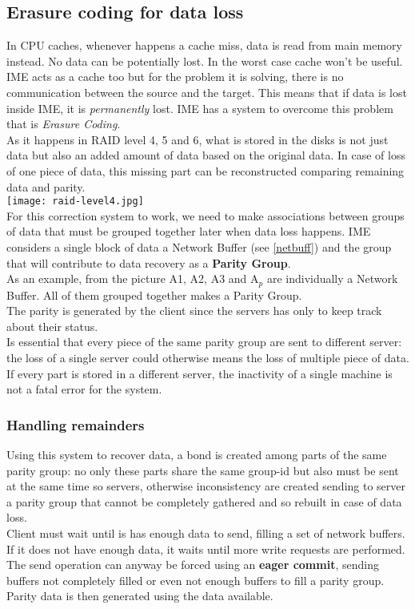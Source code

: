 \subsection{Erasure coding for data loss} \label{pargroup}
In CPU caches, whenever happens a cache miss, data is read from main memory
instead. No data can be potentially lost. In the worst case cache won't be
useful. \\
IME acts as a cache too but for the problem it is solving, there is no
communication between the source and the target. This means that if data
is lost inside IME, it is \textit{permanently} lost. IME has a system to
overcome this problem that is \textit{Erasure Coding}. \\
As it happens in RAID level 4, 5 and 6, what is stored in the disks is not just
data but also an added amount of data based on the original data. In case of
loss of one piece of data, this missing part can be reconstructed comparing
remaining data and parity. \\
\texttt{[image: raid-level4.jpg]} \\
For this correction system to work, we need to make associations between groups
of data that must be grouped together later when data loss happens. IME
considers a single block of data a Network Buffer (see \ref{netbuff}) and the
group that will contribute to data recovery as a \textbf{Parity Group}. \\
As an example, from the picture A1, A2, A3 and A$_p$ are individually a Network
Buffer. All of them grouped together makes a Parity Group. \\
The parity is generated by the client since the servers has only to keep track
about their status. \\
Is essential that every piece of the same parity group are sent to
different server: the loss of a single server could otherwise means the loss of
multiple piece of data. If every part is stored in a different server, the
inactivity of a single machine is not a fatal error for the system.

\subsubsection*{Handling remainders}
Using this system to recover data, a bond is created among parts of the same parity group:
no only these parts share the same group-id but also must be sent at the same time so servers,
otherwise inconsistency are created sending to server a parity group that cannot be completely gathered
and so rebuilt in case of data loss. \\
Client must wait until is has enough data to send, filling a set of network buffers. If it does not have
enough data, it waits until more write requests are performed. The send operation can anyway be forced using an
\textbf{eager commit}, sending buffers not completely filled or even not enough buffers to fill a parity group. \\
Parity data is then generated using the data available.

